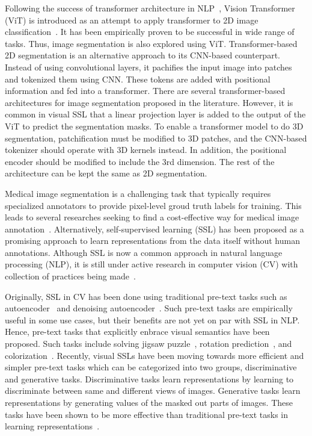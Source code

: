 \documentclass[a4paper,11pt,oneside]{report}
\begin{document}

Following the success of transformer architecture in NLP~\cite{Vaswani2017}, Vision Transformer (ViT) is introduced as an attempt to apply transformer to 2D image classification~\cite{Dosovitskiy2020vit}. It has been empirically proven to be successful in wide range of tasks. Thus, image segmentation is also explored using ViT. Transformer-based 2D segmentation is an alternative approach to its CNN-based counterpart. Instead of using convolutional layers, it pachifies the input image into patches and tokenized them using CNN. These tokens are added with positional information and fed into a transformer. There are several transformer-based architectures for image segmentation proposed in the literature. However, it is common in visual SSL that a linear projection layer is added to the output of the ViT to predict the segmentation masks. To enable a transformer model to do 3D segmentation, patchification must be modified to 3D patches, and the CNN-based tokenizer should operate with 3D kernels instead. In addition, the positional encoder should be modified to include the 3rd dimension. The rest of the architecture can be kept the same as 2D segmentation.


Medical image segmentation is a challenging task that typically requires specialized annotators to provide pixel-level groud truth labels for training. This leads to several researches seeking to find a cost-effective way for medical image annotation~\cite{Fu2012, Gal2017, Beluch2018, Rahimi2021}. Alternatively, self-supervised learning (SSL) has been proposed as a promising approach to learn representations from the data itself without human annotations. Although SSL is now a common approach in natural language processing (NLP), it is still under active research in computer vision (CV) with collection of practices being made~\cite{Balestriero2023}. 

Originally, SSL in CV has been done using traditional pre-text tasks such as  autoencoder~\cite{Hinton2006} and denoising autoencoder~\cite{Vincent2008}. Such pre-text tasks are empirically useful in some use cases, but their benefits are not yet on par with SSL in NLP. Hence, pre-text tasks that explicitly enbrace visual semantics have been proposed. Such tasks include solving jigsaw puzzle~\cite{Noroozi2016}, rotation prediction~\cite{Gidaris2018}, and colorization~\cite{Larsson2017}. Recently, visual SSLs have been moving towards more efficient and simpler pre-text tasks which can be categorized into two groups, discriminative and generative tasks. Discriminative tasks learn representations by learning to discriminate between same and different views of images. Generative tasks learn representations by generating values of the masked out parts of images. These tasks have been shown to be more effective than traditional pre-text tasks in learning representations~\cite{Chen2020Simple, He2020, He2022, Bao2022beit}.
\end{document}
